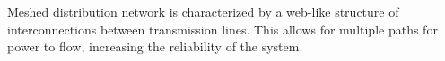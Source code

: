 Meshed distribution network is characterized by a web-like structure of interconnections between transmission lines. This allows for multiple paths for power to flow, increasing the reliability of the system.






\begin{comment}

potential sources

\end{comment}
